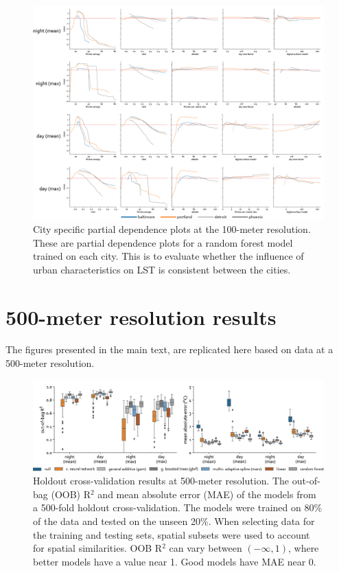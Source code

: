 \documentclass[final,3p,times,twocolumn,sort&compress]{elsarticle}
\begin{document}
\begin{figure}[h]
    \centering
    \includegraphics[width=\linewidth]{fig/report/pdp_cities_100.png}
    \caption[City specific partial dependence plots at the 100-meter resolution]{
    City specific partial dependence plots at the 100-meter resolution.
    These are partial dependence plots for a random forest model trained on each city.
    This is to evaluate whether the influence of urban characteristics on LST is consistent between the cities.
    }
    \label{fig:cities_100}
\end{figure}


\clearpage
\section{500-meter resolution results}
\label{ss:500_meter}
The figures presented in the main text, are replicated here based on data at a 500-meter resolution.

\begin{figure}[h]
    \centering
    \includegraphics[width=\linewidth]{fig/report/holdout_500.png}
    \caption[Holdout cross-validation results at 500-meter resolution]{
    Holdout cross-validation results at 500-meter resolution. 
    The out-of-bag (OOB) R$^2$ and mean absolute error (MAE) of the models from a 500-fold holdout cross-validation. 
    The models were trained on 80\% of the data and tested on the unseen 20\%.
    When selecting data for the training and testing sets, spatial subsets were used to account for spatial similarities. 
    OOB R$^2$ can vary between $(-\infty, 1)$, where better models have a value near 1. 
    Good models have MAE near 0.
    }
    \label{fig:holdout_500}
\end{figure}
\end{document}
